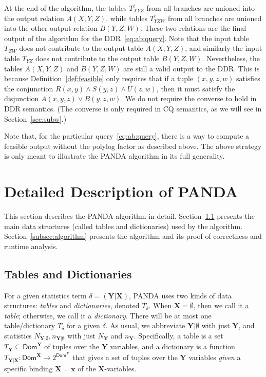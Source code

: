 \documentclass[10pt,a4paper]{article}
\newcommand{\dom}{\textsf{Dom}}
\newcommand{\panda}{\textsf{PANDA}\xspace}
\begin{document}
At the end of the algorithm, the tables $T^i_{XYZ}$ from all branches are unioned into the
output relation $A(X, Y, Z)$, while tables $T^i_{YZW}$ from all branches are unioned into the
other output relation $B(Y, Z, W)$. These two relations are the final output of the
algorithm for the DDR~\eqref{eq:ab:query}.
Note that the input table $T_{ZW}$ does not contribute to the output table $A(X,Y,Z)$, and similarly the input table $T_{YZ}$ does not contribute to the output table $B(Y,Z,W)$.
Nevertheless, the tables $A(X,Y,Z)$ and $B(Y,Z,W)$ are still a valid output to the DDR. This is because Definition~\ref{def:feasible} only requires that if a tuple $(x, y, z, w)$ satisfies the conjunction $R(x,y) \wedge S(y,z) \wedge U(z,w)$, then it must satisfy the disjunction $A(x,y,z) \vee B(y,z,w)$.
We do not require the converse to hold in DDR semantics. (The converse is only required in CQ semantics, as we will see in Section~\ref{sec:subw}.)

Note that, for the particular query~\eqref{eq:ab:query}, there is a way to compute a
feasible output without the polylog factor as described above. The above strategy is only
meant to illustrate the \panda algorithm in its full generality.


\section{Detailed Description of \panda}
\label{sec:algorithm}

This section describes the \panda algorithm in detail.
Section~\ref{subsec:tables:dictionaries} presents the main data structures (called tables
and dictionaries) used by the algorithm. Section~\ref{subsec:algorithm} presents the
algorithm and its proof of correctness and runtime analysis.

\subsection{Tables and Dictionaries}
\label{subsec:tables:dictionaries}

For a given statistics term $\delta = (\bm Y | \bm X)$, \panda uses two kinds of data
structures: {\em tables} and {\em dictionaries}, denoted $T_\delta$.  When $\bm
X=\emptyset$, then we call it a {\em table}; otherwise, we call it a {\em dictionary}.
There will be at most one table/dictionary $T_\delta$ for a given $\delta$. As usual, we
abbreviate $\bm Y|\emptyset$ with just $\bm Y$, and statistics
$N_{\bm Y|\emptyset}, n_{\bm Y|\emptyset}$
with just $N_{\bm Y}$ and $n_{\bm Y}$.
Specifically, a table is a set $T_{\bm Y} \subseteq \dom^{\bm Y}$ of tuples over the $\bm Y$ variables,
and a dictionary is a function $T_{\bm Y|\bm X} : \dom^{\bm X} \rightarrow 2^{\dom^{\bm Y}}$
that gives a set of tuples over the $\bm Y$ variables {\em given} a specific binding
$\bm X =\bm x$ of the $\bm X$-variables.
\end{document}
